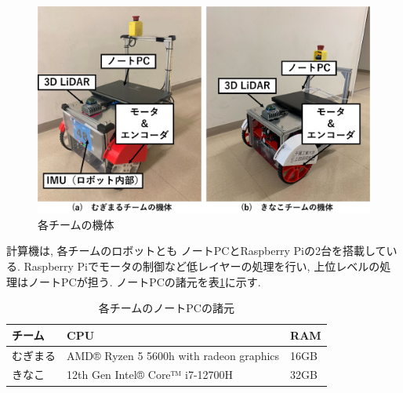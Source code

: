 \documentclass[twocolumn,9pt]{jsproceedings}
\begin{document}
 \begin{figure}[htbp]
   \begin{center}
     \includegraphics[width=1.0\linewidth]{figs/robot.eps}
     \caption{各チームの機体}
     \label{fig:robot}
   \end{center}
 \end{figure}



計算機は, 各チームのロボットとも
ノートPCとRaspberry Piの2台を搭載している. 
Raspberry Piでモータの制御など低レイヤーの処理を行い, 
上位レベルの処理はノートPCが担う. 
ノートPCの諸元を表\ref{table:laptop}に示す. 

\begin{table}[H]
  \centering
  \caption{各チームのノートPCの諸元}
  \label{table:laptop}
	  \begin{tabular}{|l|p{5.0cm}|l|}
    \hline
    チーム   & CPU & RAM\\ 
    \hline
    むぎまる & AMD® Ryzen 5 5600h with radeon graphics & 16GB \\ 
    \hline
    きなこ   & 12th Gen Intel® Core™ i7-12700H  & 32GB \\
    \hline
  \end{tabular}
\end{table}
\end{document}
